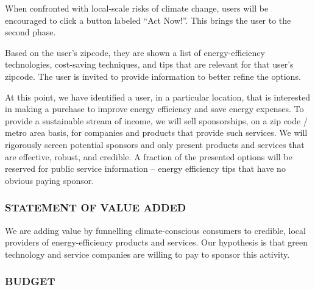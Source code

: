 \documentclass[12pt]{article}
\begin{document}
When confronted with local-scale risks of climate change, users will
be encouraged to click a button labeled ``Act Now!''. This brings the
user to the second phase.

Based on the user's zipcode, they are shown a list of
energy-efficiency technologies, cost-saving techniques, and tips that
are relevant for that user's zipcode. The user is invited to provide
information to better refine the options.

At this point, we have identified a user, in a particular location,
that is interested in making a purchase to improve energy efficiency
and save energy expenses. To provide a sustainable stream of income,
we will sell sponsorships, on a zip code / metro area basis, for
companies and products that provide such services. We will rigorously
screen potential sponsors and only present products and services that
are effective, robust, and credible. A fraction of the presented
options will be reserved for public service information -- energy
efficiency tips that have no obvious paying sponsor.


\subsubsection*{STATEMENT OF VALUE ADDED}

We are adding value by funnelling climate-conscious consumers to
credible, local providers of energy-efficiency products and services.
Our hypothesis is that green technology and service companies are
willing to pay to sponsor this activity.

\subsubsection*{BUDGET}
\end{document}
